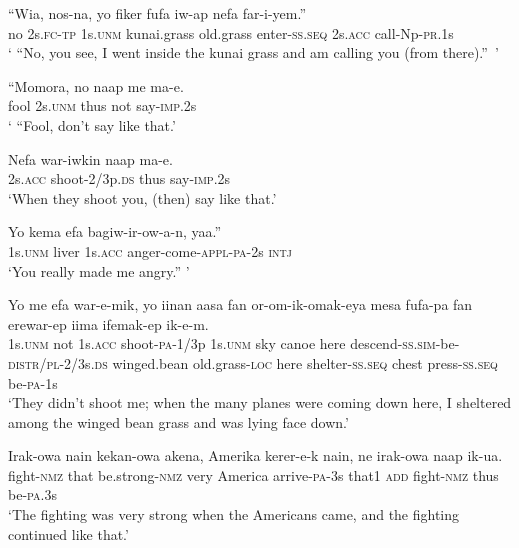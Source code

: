 \ea\label{ex:a:x81}
\gll  “Wia,  nos-na,  yo  fiker  fufa  iw-ap nefa  far-i-yem.” \\
no  2s.\textsc{fc}-\textsc{tp}  1s.\textsc{unm}  kunai.grass  old.grass  enter-\textsc{ss.seq} 2s.\textsc{acc}  call-Np-\textsc{pr}.1s \\
\glt ‘ “No, you see, I went inside the kunai grass and am calling you (from there).”~’ \\
\z


\ea\label{ex:a:x82}
\gll  “Momora,  no  naap  me  ma-e. \\
fool  2s.\textsc{unm}  thus  not  say-\textsc{imp}.2s \\
\glt ‘ “Fool, don’t say like that.’ \\
\z


\ea\label{ex:a:x83}
\gll  Nefa  war-iwkin  naap  ma-e. \\
2s.\textsc{acc}  shoot-2/3p.\textsc{ds}  thus  say-\textsc{imp}.2s \\
\glt ‘When they shoot you, (then) say like that.’ \\
\z


\ea\label{ex:a:x84}
\gll  Yo  kema  efa  bagiw-ir-ow-a-n,  yaa.” \\
1s.\textsc{unm}  liver  1s.\textsc{acc}  anger-come-\textsc{appl}-\textsc{pa}-2s  \textsc{intj} \\
\glt ‘You really made me angry.” ’ \\
\z


\ea\label{ex:a:x85}
\gll  Yo  me  efa  war-e-mik,  yo  iinan  aasa  fan or-om-ik-omak-eya  mesa  fufa-pa  fan  erewar-ep  iima  ifemak-ep  ik-e-m. \\
1s.\textsc{unm}  not  1s.\textsc{acc}  shoot-\textsc{pa}-1/3p  1s.\textsc{unm}  sky  canoe  here descend-\textsc{ss}.\textsc{sim}-be-\textsc{distr}/\textsc{pl}-2/3s.\textsc{ds}  winged.bean  old.grass-\textsc{loc} here  shelter-\textsc{ss.seq}  chest  press-\textsc{ss.seq}  be-\textsc{pa}-1s \\
\glt ‘They didn’t shoot me; when the many planes were coming down here, I sheltered among the winged bean grass and was lying face down.’ \\
\z


\ea\label{ex:a:x86}
\gll  Irak-owa  nain  kekan-owa  akena,  Amerika  kerer-e-k  nain,  ne  irak-owa  naap  ik-ua. \\
fight-\textsc{nmz}  that  be.strong-\textsc{nmz}  very  America  arrive-\textsc{pa}-3s  that1 \textsc{add}  fight-\textsc{nmz}  thus  be-\textsc{pa}.3s \\
\glt ‘The fighting was very strong when the Americans came, and the fighting continued like that.’ \\
\z


